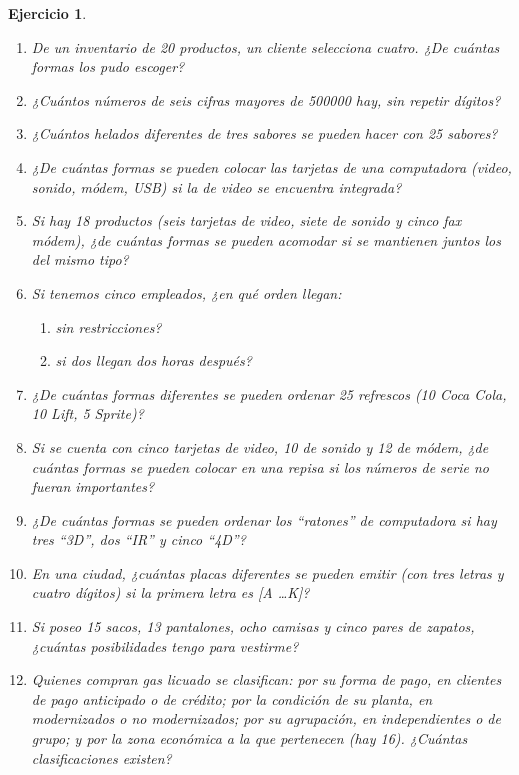 \documentclass[12pt,twoside]{article}
\newtheorem{Ejer}{Ejercicio}
\begin{document}
\begin{Ejer}
\begin{enumerate}
\item De un inventario de 20 productos, un cliente selecciona cuatro. ¿De cuántas formas los pudo escoger?

\item ¿Cuántos números de seis cifras mayores de 500000 hay, sin repetir dígitos?

\item ¿Cuántos helados diferentes de tres sabores se pueden hacer con 25 sabores?

\item ¿De cuántas formas se pueden colocar las tarjetas de una computadora (video, sonido, módem, USB) si la de video se encuentra integrada?

\item Si hay 18 productos (seis tarjetas de video, siete de sonido y cinco fax módem), ¿de cuántas formas se pueden acomodar si se mantienen juntos los del mismo tipo?

\item Si tenemos cinco empleados, ¿en qué orden llegan:
\begin{enumerate}
\item sin restricciones?
\item si dos llegan dos horas después?
\end{enumerate}

\item ¿De cuántas formas diferentes se pueden ordenar 25 refrescos (10 Coca Cola, 10 Lift, 5 Sprite)?

\item Si se cuenta con cinco tarjetas de video, 10 de sonido y 12 de módem, ¿de cuántas formas se pueden colocar en una repisa si los números de serie no fueran importantes?

\item ¿De cuántas formas se pueden ordenar los “ratones” de computadora si hay tres “3D”, dos “IR” y cinco “4D”?

\item En una ciudad, ¿cuántas placas diferentes se pueden emitir (con tres letras y cuatro dígitos) si la primera letra es [A \dots K]?

\item Si poseo 15 sacos, 13 pantalones, ocho camisas y cinco pares de zapatos, ¿cuántas posibilidades tengo para vestirme?

\item Quienes compran gas licuado se clasifican: por su forma de pago, en clientes de pago anticipado o de crédito; por la condición de su planta, en modernizados o no modernizados; por su agrupación, en independientes o de grupo; y por la zona económica a la que pertenecen (hay 16). ¿Cuántas clasificaciones existen?


\end{enumerate}
\end{Ejer}
\end{document}
